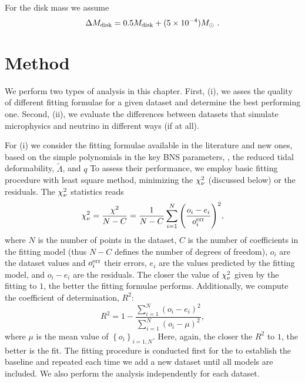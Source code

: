 For the disk mass we assume \citep{Radice:2018pdn}
\begin{equation}
\Delta M_{\text{disk}} = 0.5M_{\rm disk} + (5\times
10^{-4})M_{\odot}\ .
\label{eq:disk:mdisk_err}
\end{equation}



\section{Method}

We perform two types of analysis in this chapter.
First, (i), we asses the quality of different fitting formulae for a given
dataset and determine the best performing one.
Second, (ii), we evaluate the differences between datasets that 
simulate microphysics and neutrino in different ways (if at all).

For (i) we consider the fitting formulae available in the literature 
and new ones, based on the simple polynomials in the key \ac{BNS} parameters, \ie, 
the reduced tidal deformability, $\tilde{\Lambda}$, and \mr{} $q$
To assess their performance, we employ basic fitting procedure with least
square method, minimizing the $\chi_{\nu}^2$ (discussed below) or the residuals.
The $\chi_{\nu}^2$ statistics reads
\begin{equation}
\chi_{\nu}^{2} = \frac{\chi^2}{N - C} = \frac{1}{N-C}\sum\limits_{i=1}^{N}\Bigg(\frac{o_i - e_i}{o_i ^{\rm err}}\Bigg)^2,
\label{eq:theory:chi2dof}
\end{equation}
where $N$ is the number of points in the dataset, $C$ is the number of coefficients in the 
fitting model (thus $N-C$ defines the number of degrees of freedom),
$o_i$ are the dataset values and $o_i ^{\rm err}$ their errors,
$e_i$ are the values predicted by the fitting model, and 
$o_i - e_i$ are the residuals.
The closer the value of $\chi_{\nu}^2$ given by the fitting to $1$, the better the fitting formulae performs.
Additionally, we compute the coefficient of determination, $R^2$:
\begin{equation}
R^2 = 1 - \frac{\sum\limits_{i=1}^{N}(o_i - e_i)^2}{\sum\limits_{i=1}^{N}(o_i - \mu)^2},
\end{equation}
where $\mu$ is the mean value of $\left\{ o_i \right\}_{i=1,N}$.
Here, again, the closer the $R^2$ to $1$, the better is the fit. 
The fitting procedure is conducted first for the \DSrefset{} to establish
the baseline and repeated each time we add a new dataset until all models are included.
We also perform the analysis independently for each dataset.

